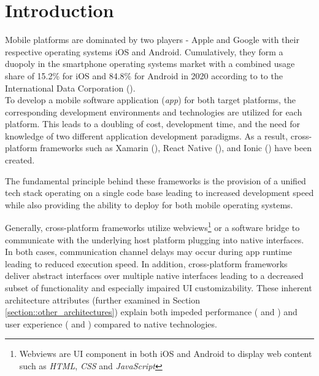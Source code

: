 \chapter{Introduction}
\label{section:introduction}
Mobile platforms are dominated by two players - Apple and Google with their respective operating systems iOS and Android. 
Cumulatively, they form a duopoly in the smartphone operating systems market with a combined usage share of 
15.2\% for iOS and 84.8\% for Android in 2020 according to to the International Data Corporation (\cite{IDC2021}).
\\To develop a mobile software application (\textit{app}) for both target platforms, the corresponding development environments and technologies 
are utilized for each platform. This leads to a doubling of cost, development time, and 
the need for knowledge of two different application development paradigms. 
As a result, cross-platform frameworks such as Xamarin (\cite{Xamarin2021}), React Native (\cite{Facebook2021}), and Ionic (\cite{Ionic2021}) have been created. 

The fundamental principle behind these frameworks is the provision of a unified tech stack operating on a single code base leading to increased development speed
while also providing the ability to deploy for both mobile operating systems.

Generally, cross-platform frameworks utilize webviews\footnote{Webviews are UI component in both iOS and Android to display web content such as \textit{HTML}, \textit{CSS} and \textit{JavaScript}} or a software bridge to communicate with the underlying host platform plugging into 
native interfaces. In both cases, communication channel delays may occur during app runtime leading to reduced execution speed. In addition, 
cross-platform frameworks deliver abstract interfaces over multiple native interfaces leading to a decreased subset of functionality
and especially impaired UI customizability. These inherent architecture attributes (further examined in Section \ref{section::other_architectures}) explain
both impeded performance (\cite{Ebone2018} and \cite{Corbalan2019}) and user experience (\cite{Mercado2016} and \cite{Angulo2014}) compared to native technologies.

